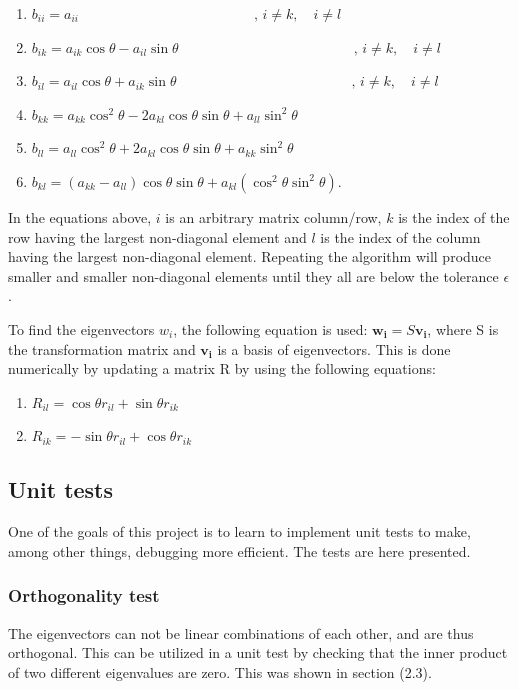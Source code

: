 \documentclass[10pt,a4paper,titlepage]{article}
\begin{document}
\begin{enumerate}
\item $b_{ii}=a_{ii}\,\,\,\quad\quad\quad\quad\quad\quad\quad\quad\quad\quad\quad\quad,\, i\not=k,\quad i\not= l$
\item $b_{ik}=a_{ik}\cos\theta-a_{il}\sin\theta\,\,\,\quad\quad\quad\quad\quad\quad\quad\quad\quad\quad\quad\quad,\, i\not=k,\quad i\not= l$
\item $b_{il}=a_{il}\cos\theta+a_{ik}\sin\theta\,\,\,\quad\quad\quad\quad\quad\quad\quad\quad\quad\quad\quad\quad,\, i\not=k,\quad i\not= l$
\item $b_{kk}=a_{kk}\cos^2\theta-2a_{kl}\cos\theta \sin\theta +a_{ll}\sin^2\theta$
\item $b_{ll}=a_{ll}\cos^2\theta+2a_{kl}\cos\theta \sin\theta +a_{kk}\sin^2\theta$
\item $b_{kl}=(a_{kk}-a_{ll})\cos\theta \sin\theta + a_{kl}(\cos^2\theta \sin^2\theta)$.
\end{enumerate}
In the equations above, $i$ is an arbitrary matrix column/row, $k$ is the index of the row having the largest non-diagonal element and $l$ is the index of the column having the largest non-diagonal element. Repeating the algorithm will produce smaller and smaller non-diagonal elements until they all are below the tolerance $\epsilon$.

To find the eigenvectors $w_{i}$, the following equation is used:
$\mathbf{w_{i}}=S\mathbf{v_{i}}$,
where S is the transformation matrix and $\mathbf{v_{i}}$ is a basis of eigenvectors. This is done numerically by updating a matrix R by using the following equations:
\begin{enumerate}
\item $R_{il}=\cos\theta r_{il}+\sin\theta r_{ik}$
\item $R_{ik}=-\sin\theta r_{il}+\cos\theta r_{ik}$
\end{enumerate}

\subsection{Unit tests}
One of the goals of this project is to learn to implement unit tests to make, among other things, debugging more efficient. The tests are here presented. 
\subsubsection{Orthogonality test}
The eigenvectors can not be linear combinations of each other, and are thus orthogonal. This can be utilized in a unit test by checking that the inner product of two different eigenvalues are zero. This was shown in section (2.3).
\end{document}
